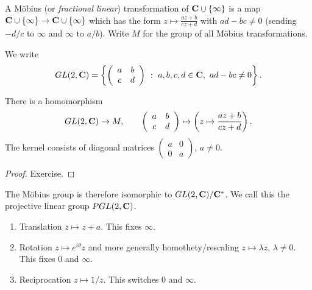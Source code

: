 \documentclass[12pt]{article}
\begin{document}
\begin{dfn}
  A M\"obius (or {\em fractional linear}) transformation of $\mathbf{C}\cup\{\infty\}$ is a map $\mathbf{C}\cup\{\infty\}\to\mathbf{C}\cup\{\infty\}$ which has the form $z\mapsto\frac{az+b}{cz+d}$ with $ad-bc\neq 0$ (sending $-d/c$ to $\infty$ and $\infty$ to $a/b$). Write $M$ for the group of all M\"obius transformations.
\end{dfn}

We write
\[GL(2,\CC)=\left\{\left(\begin{array}{cc}a&b\\c&d\end{array}\right)\ :\ a,b,c,d\in\CC,\ ad-bc\neq 0\right\}.\]
  \begin{lma}
    There is a homomorphism
    \[GL(2,\mathbf{C})\to M,\qquad\left(\begin{array}{cc}a&b\\c&d\end{array}\right)\mapsto\left(z\mapsto\frac{az+b}{cz+d}\right).\]
    The kernel consists of diagonal matrices $\left(\begin{array}{cc}a& 0 \\0&a\end{array}\right)$, $a\neq 0$.
  \end{lma}
  \begin{proof}
    Exercise.
  \end{proof}

The M\"obius group is therefore isomorphic to $GL(2,\mathbf{C})/\mathbf{C}^*$. We call this the projective linear group $PGL(2,\mathbf{C})$.
  
  \begin{exm}
    \begin{enumerate}
    \item Translation $z\mapsto z+a$. This fixes $\infty$.
    \item Rotation $z\mapsto e^{i\theta}z$ and more generally homothety/rescaling $z\mapsto \lambda z$, $\lambda\neq 0$. This fixes $0$ and $\infty$.
    \item Reciprocation $z\mapsto 1/z$. This switches 0 and $\infty$.
    \end{enumerate}
  \end{exm}
\end{document}
